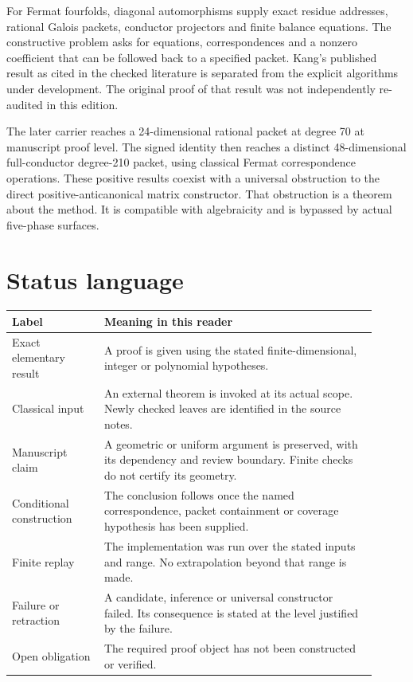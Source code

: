 For Fermat fourfolds, diagonal automorphisms supply exact residue addresses, rational Galois packets, conductor projectors and finite balance equations. The constructive problem asks for equations, correspondences and a nonzero coefficient that can be followed back to a specified packet. Kang's published result as cited in the checked literature is separated from the explicit algorithms under development. The original proof of that result was not independently re-audited in this edition.

The later carrier reaches a 24-dimensional rational packet at degree 70 at manuscript proof level. The signed identity then reaches a distinct 48-dimensional full-conductor degree-210 packet, using classical Fermat correspondence operations. These positive results coexist with a universal obstruction to the direct positive-anticanonical matrix constructor. That obstruction is a theorem about the method. It is compatible with algebraicity and is bypassed by actual five-phase surfaces.

\section*{Status language}
\begin{longtable}{p{0.23\linewidth}p{0.68\linewidth}}
\toprule
Label & Meaning in this reader\\
\midrule
Exact elementary result & A proof is given using the stated finite-dimensional, integer or polynomial hypotheses.\\
Classical input & An external theorem is invoked at its actual scope. Newly checked leaves are identified in the source notes.\\
Manuscript claim & A geometric or uniform argument is preserved, with its dependency and review boundary. Finite checks do not certify its geometry.\\
Conditional construction & The conclusion follows once the named correspondence, packet containment or coverage hypothesis has been supplied.\\
Finite replay & The implementation was run over the stated inputs and range. No extrapolation beyond that range is made.\\
Failure or retraction & A candidate, inference or universal constructor failed. Its consequence is stated at the level justified by the failure.\\
Open obligation & The required proof object has not been constructed or verified.\\
\bottomrule
\end{longtable}

